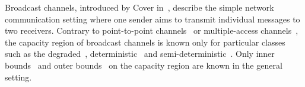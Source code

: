 Broadcast channels, introduced by Cover in~\cite{Cover72}, describe the simple network communication setting where one sender aims to transmit individual messages to two receivers. Contrary to point-to-point channels~\cite{Shannon48} or multiple-access channels~\cite{Liao73,Ahlswede73}, the capacity region of broadcast channels is known only for particular classes such as the degraded~\cite{Bergmans73,Gallager74,AK75}, deterministic~\cite{Marton77,Pinsker78} and semi-deterministic~\cite{GIP80}. Only inner bounds~\cite{Cover75,Meulen75,Marton79} and outer bounds~\cite{Sato78,Marton79,NG07,GN20} on the capacity region are known in the general setting.



